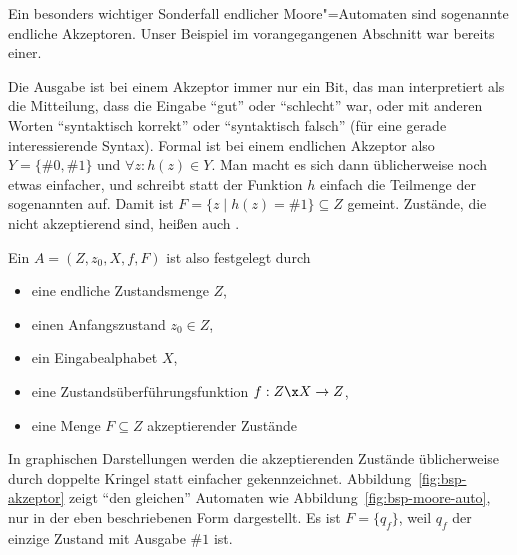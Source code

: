 Ein besonders wichtiger Sonderfall endlicher Moore"=Automaten sind
sogenannte endliche Akzeptoren. Unser Beispiel im vorangegangenen
Abschnitt war bereits einer.

Die Ausgabe ist bei einem Akzeptor immer nur ein Bit, das man
interpretiert als die Mitteilung, dass die Eingabe "`gut"' oder
"`schlecht"' war, oder mit anderen Worten "`syntaktisch korrekt"' oder
"`syntaktisch falsch"' (für eine gerade interessierende
Syntax). Formal ist bei einem endlichen Akzeptor also $Y=\{\#0,\#1\}$
und $\forall z: h(z)\in Y$. Man macht es sich dann üblicherweise noch
etwas einfacher, und schreibt statt der Funktion $h$ einfach die
Teilmenge der sogenannten  auf. Damit ist $F=\{z \mid h(z) =\#1\}\subseteq Z$
gemeint. Zustände, die nicht akzeptierend sind, heißen auch
.

Ein  $A=(Z,z_0,X,f,F)$ ist also
festgelegt durch
\begin{itemize}
\item eine endliche Zustandsmenge $Z$,
\item einen Anfangszustand $z_0\in Z$,
\item ein Eingabealphabet $X$,
\item eine Zustandsüberführungsfunktion $f:Z\x X\to Z$,
\item eine Menge $F\subseteq Z$ akzeptierender Zustände
\end{itemize}
%
In graphischen Darstellungen werden die akzeptierenden Zustände
üblicherweise durch doppelte Kringel statt einfacher
gekennzeichnet. Abbildung~\ref{fig:bsp-akzeptor} zeigt "`den
gleichen"' Automaten wie Abbildung~\ref{fig:bsp-moore-auto}, nur in
der eben beschriebenen Form dargestellt. Es ist $F=\{q_f\}$, weil
$q_f$ der einzige Zustand mit Ausgabe $\#1$ ist.

